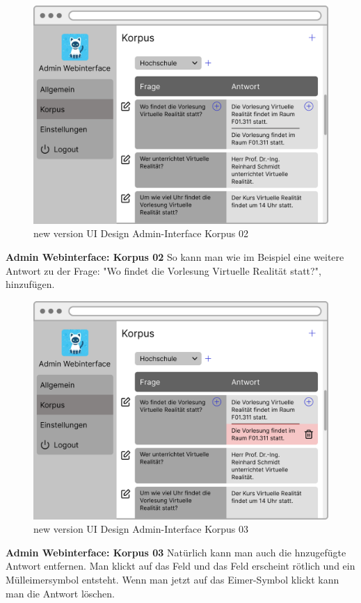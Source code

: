 \begin{figure}[H]
    \centering
    \includegraphics[width=1.0\textwidth]{bilder/new vers. UI Design/Korpus/Admin Interface 02.png}
    \caption{new version UI Design Admin-Interface Korpus 02}
    \label{fig:new version UI Design Admin-Interface Korpus 02}
\end{figure}
\noindent \textbf{Admin Webinterface: Korpus 02} \newline
So kann man wie im Beispiel eine weitere Antwort zu der Frage: "Wo findet die Vorlesung Virtuelle
Realität statt?", hinzufügen.

\begin{figure}[H]
    \centering
    \includegraphics[width=1.0\textwidth]{bilder/new vers. UI Design/Korpus/Admin Interface 03.png}
    \caption{new version UI Design Admin-Interface Korpus 03}
    \label{fig:new version UI Design Admin-Interface Korpus 03}
\end{figure}
\noindent \textbf{Admin Webinterface: Korpus 03} \newline
Natürlich kann man auch die hnzugefügte Antwort entfernen. Man klickt auf das Feld und das Feld erscheint rötlich und ein
Mülleimersymbol entsteht. Wenn man jetzt auf das Eimer-Symbol klickt kann man die
Antwort löschen.

